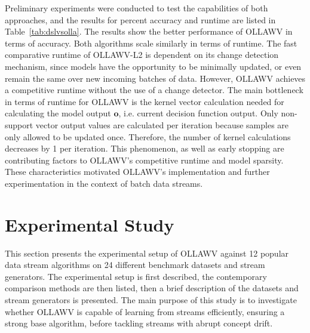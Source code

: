 \documentclass[reqno]{vcuthesis}
\numberwithin{equation}{chapter}
\begin{document}
Preliminary experiments were conducted to test the capabilities of both approaches, and the results for percent accuracy and runtime are listed in Table~\ref{tab:dslvsolla}. The results show the better performance of OLLAWV in terms of accuracy. Both algorithms scale similarly in terms of runtime. The fast comparative runtime of OLLAWV-L2 is dependent on its change detection mechanism, since models have the opportunity to be minimally updated, or even remain the same over new incoming batches of data. However, OLLAWV achieves a competitive runtime without the use of a change detector. The main bottleneck in terms of runtime for OLLAWV is the kernel vector calculation needed for calculating the model output $\bm o$, i.e. current decision function output. Only non-support vector output values are calculated per iteration because samples are only allowed to be updated once. Therefore, the number of kernel calculations decreases by 1 per iteration. This phenomenon, as well as early stopping are contributing factors to OLLAWV's competitive runtime and model sparsity. These characteristics motivated OLLAWV's implementation and further experimentation in the context of batch data streams.

\section{Experimental Study}
This section presents the experimental setup of OLLAWV against 12 popular data stream algorithms on 24 different benchmark datasets and stream generators. The experimental setup is first described, the contemporary comparison methods are then listed, then a brief description of the datasets and stream generators is presented. The main purpose of this study is to investigate whether OLLAWV is capable of learning from streams efficiently, ensuring a strong base algorithm, before tackling streams with abrupt concept drift. 
\end{document}

